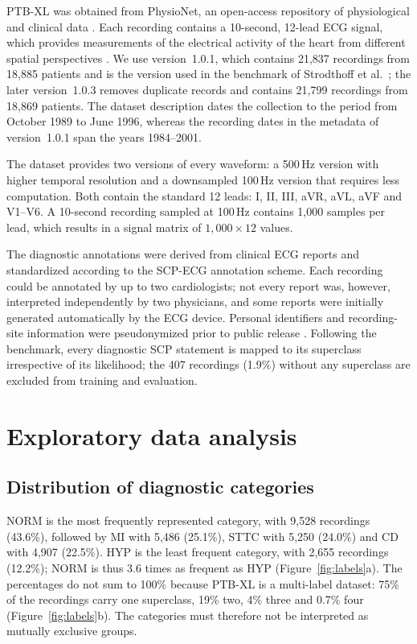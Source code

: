 \documentclass{article}
\begin{document}
PTB-XL was obtained from PhysioNet, an open-access repository of physiological and clinical data \citep{wagner2020}. Each recording contains a 10-second, 12-lead ECG signal, which provides measurements of the electrical activity of the heart from different spatial perspectives \citep{wagner2020}. We use version~1.0.1, which contains 21,837 recordings from 18,885 patients and is the version used in the benchmark of Strodthoff et al.\ \citep{strodthoff2021}; the later version~1.0.3 removes duplicate records and contains 21,799 recordings from 18,869 patients. The dataset description dates the collection to the period from October 1989 to June 1996, whereas the recording dates in the metadata of version~1.0.1 span the years 1984--2001.

The dataset provides two versions of every waveform: a 500\,Hz version with higher temporal resolution and a downsampled 100\,Hz version that requires less computation. Both contain the standard 12 leads: I, II, III, aVR, aVL, aVF and V1--V6. A 10-second recording sampled at 100\,Hz contains 1,000 samples per lead, which results in a signal matrix of $1{,}000\times12$ values.

The diagnostic annotations were derived from clinical ECG reports and standardized according to the SCP-ECG annotation scheme. Each recording could be annotated by up to two cardiologists; not every report was, however, interpreted independently by two physicians, and some reports were initially generated automatically by the ECG device. Personal identifiers and recording-site information were pseudonymized prior to public release \citep{wagner2020}. Following the benchmark, every diagnostic SCP statement is mapped to its superclass irrespective of its likelihood; the 407 recordings (1.9\%) without any superclass are excluded from training and evaluation.

\section{Exploratory data analysis}
\label{sec:eda}

\subsection{Distribution of diagnostic categories}

NORM is the most frequently represented category, with 9,528 recordings (43.6\%), followed by MI with 5,486 (25.1\%), STTC with 5,250 (24.0\%) and CD with 4,907 (22.5\%). HYP is the least frequent category, with 2,655 recordings (12.2\%); NORM is thus 3.6 times as frequent as HYP (Figure~\ref{fig:labels}a). The percentages do not sum to 100\% because PTB-XL is a multi-label dataset: 75\% of the recordings carry one superclass, 19\% two, 4\% three and 0.7\% four (Figure~\ref{fig:labels}b). The categories must therefore not be interpreted as mutually exclusive groups.
\end{document}

